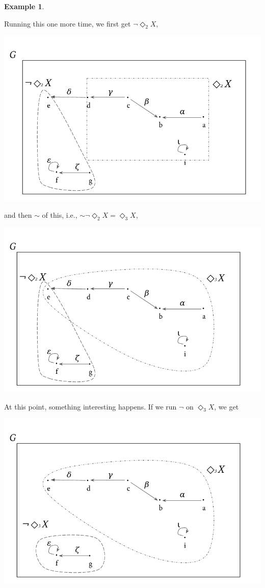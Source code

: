 \documentclass[a4paper]{book}
\theoremstyle{definition}
\newtheorem{example}{Example}[section]
\theoremstyle{definition}
\theoremstyle{definition}
\theoremstyle{theorem}
\theoremstyle{definition}
\begin{document}
\begin{example}
\begin{center}
	\end{center}  
	Running this one more time, we first get $\neg \Diamond_2 X$, 
	\begin{center}
		\includegraphics*[scale=0.24]{GraphSubgraphNegation7.png}
	\end{center}  
	and then $\sim$ of this, i.e., $\sim \neg \Diamond_2 X = \Diamond_3 X$, 
	\begin{center}
		\includegraphics*[scale=0.24]{GraphSubgraphNegation8.png}
	\end{center}  
	At this point, something interesting happens. If we run $\neg$ on $\Diamond_3 X$, we get
	\begin{center}
		\includegraphics*[scale=0.24]{GraphSubgraphNegation9.png}

\end{center}
\end{example}
\end{document}
